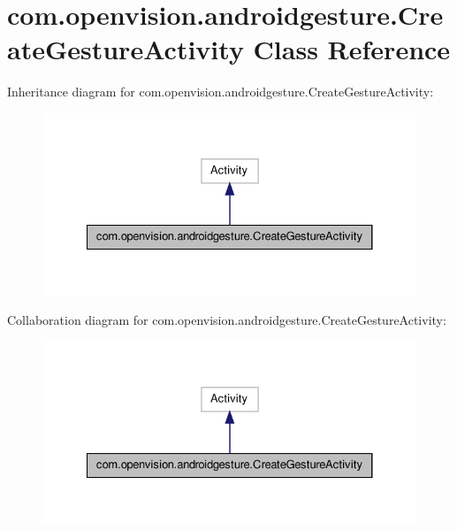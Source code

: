 \hypertarget{classcom_1_1openvision_1_1androidgesture_1_1CreateGestureActivity}{\section{com.\-openvision.\-androidgesture.\-Create\-Gesture\-Activity \-Class \-Reference}
\label{classcom_1_1openvision_1_1androidgesture_1_1CreateGestureActivity}
}


\-Inheritance diagram for com.\-openvision.\-androidgesture.\-Create\-Gesture\-Activity\-:\nopagebreak
\begin{figure}[H]
\begin{center}
\leavevmode
\includegraphics[width=330pt]{classcom_1_1openvision_1_1androidgesture_1_1CreateGestureActivity__inherit__graph}
\end{center}
\end{figure}


\-Collaboration diagram for com.\-openvision.\-androidgesture.\-Create\-Gesture\-Activity\-:\nopagebreak
\begin{figure}[H]
\begin{center}
\leavevmode
\includegraphics[width=330pt]{classcom_1_1openvision_1_1androidgesture_1_1CreateGestureActivity__coll__graph}
\end{center}
\end{figure}
